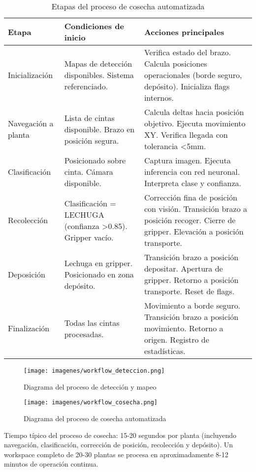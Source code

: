 \begin{table}[H]
\centering
\small
\begin{tabular}{|l|p{5.5cm}|p{5cm}|}
\hline
\textbf{Etapa} & \textbf{Condiciones de inicio} & \textbf{Acciones principales} \\
\hline
Inicialización & Mapas de detección disponibles. Sistema referenciado. & Verifica estado del brazo. Calcula posiciones operacionales (borde seguro, depósito). Inicializa flags internos. \\
\hline
Navegación a planta & Lista de cintas disponible. Brazo en posición segura. & Calcula deltas hacia posición objetivo. Ejecuta movimiento XY. Verifica llegada con tolerancia <5mm. \\
\hline
Clasificación & Posicionado sobre cinta. Cámara disponible. & Captura imagen. Ejecuta inferencia con red neuronal. Interpreta clase y confianza. \\
\hline
Recolección & Clasificación = LECHUGA (confianza >0.85). Gripper vacío. & Corrección fina de posición con visión. Transición brazo a posición recoger. Cierre de gripper. Elevación a posición transporte. \\
\hline
Deposición & Lechuga en gripper. Posicionado en zona depósito. & Transición brazo a posición depositar. Apertura de gripper. Retorno a posición transporte. Reset de flags. \\
\hline
Finalización & Todas las cintas procesadas. & Movimiento a borde seguro. Transición brazo a posición movimiento. Retorno a origen. Registro de estadísticas. \\
\hline
\end{tabular}
\caption{Etapas del proceso de cosecha automatizada}
\label{tab:proceso_cosecha}
\end{table}

\begin{figure}[H]
    \centering
    \texttt{[image: imagenes/workflow\_deteccion.png]}
    \caption{Diagrama del proceso de detección y mapeo}
    \label{fig:workflow_deteccion}
\end{figure}

\begin{figure}[H]
    \centering
    \texttt{[image: imagenes/workflow\_cosecha.png]}
    \caption{Diagrama del proceso de cosecha automatizada}
    \label{fig:workflow_cosecha}
\end{figure}

Tiempo típico del proceso de cosecha: 15-20 segundos por planta (incluyendo navegación, clasificación, corrección de posición, recolección y depósito). Un workspace completo de 20-30 plantas se procesa en aproximadamente 8-12 minutos de operación continua.
